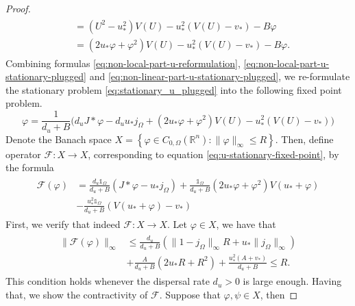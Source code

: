 \documentclass[12pt, a4paper]{article}
\theoremstyle{break}
\theoremstyle{break}
\theoremstyle{break}
\theoremstyle{break}
\theoremstyle{break}
\theoremstyle{break}
\theoremstyle{break}
\begin{document}
\begin{proof}
\begin{align}
\begin{split}
            &= (U^2 - u_*^2)V(U) - u_*^2(V(U) - v_*) - B \varphi \\
            &= (2 u_* \varphi + \varphi^2) V(U) - u_*^2(V(U) - v_*) - B \varphi.
        \end{split}
    \end{align}
    Combining formulas \eqref{eq:non-local-part-u-reformulation}, \eqref{eq:non-local-part-u-stationary-plugged} and \eqref{eq:non-linear-part-u-stationary-plugged}, we re-formulate the stationary problem \eqref{eq:stationary_u_plugged} into the following fixed point problem.
    \begin{equation}
        \label{eq:u-stationary-fixed-point}
        \varphi = \frac{1}{d_u + B}\Big(d_u J *\varphi - d_u u_* j_\Omega + (2 u_* \varphi + \varphi^2) V(U) - u_*^2(V(U) - v_*)\Big)
    \end{equation}
    Denote the Banach space $X = \left\{ \varphi \in C_{0,\Omega}(\mathbb{R}^n): \|\varphi\|_\infty \leq R \right\}$. Then, define operator $\mathcal{F}: X \rightarrow X$, corresponding to equation \eqref{eq:u-stationary-fixed-point}, by the formula
    \begin{align}
        \label{eq:operator-f-def}
        \begin{split}
            \mathcal{F}(\varphi) 
            &= 
            \frac{d_u \mathds{1}_{\Omega}}{d_u + B}\left( J *\varphi - u_* j_\Omega\right) + \frac{\mathds{1}_{\Omega}}{d_u + B}(2 u_* \varphi + \varphi^2) V (u_* + \varphi)\\
            &- \frac{u_*^2\mathds{1}_{\Omega}}{d_u + B}(V(u_* + \varphi) - v_*)        
        \end{split}
    \end{align}
    First, we verify that indeed $\mathcal{F}: X \rightarrow X$. Let $\varphi \in X$, we have that
    \begin{align}
        \label{eq:f_ball_to_ball_condition}
        \begin{split}
            \|\mathcal{F}(\varphi)\|_{\infty}
            &\leq
            \frac{d_u }{d_u + B} \left( \|1 -j_\Omega\|_\infty R + u_*\|j_\Omega\|_\infty\right) \\
            &+
            \frac{A}{d_u + B}\left( 2 u_* R + R^2 \right) 
            + \frac{u_*^2 (A + v_*)}{d_u + B} \leq R.
        \end{split}
    \end{align}
    This condition holds whenever the dispersal rate $d_u > 0$ is large enough. Having that, we show the contractivity of $\mathcal{F}$. Suppose that $\varphi, \psi \in X$, then

\end{proof}
\end{document}
